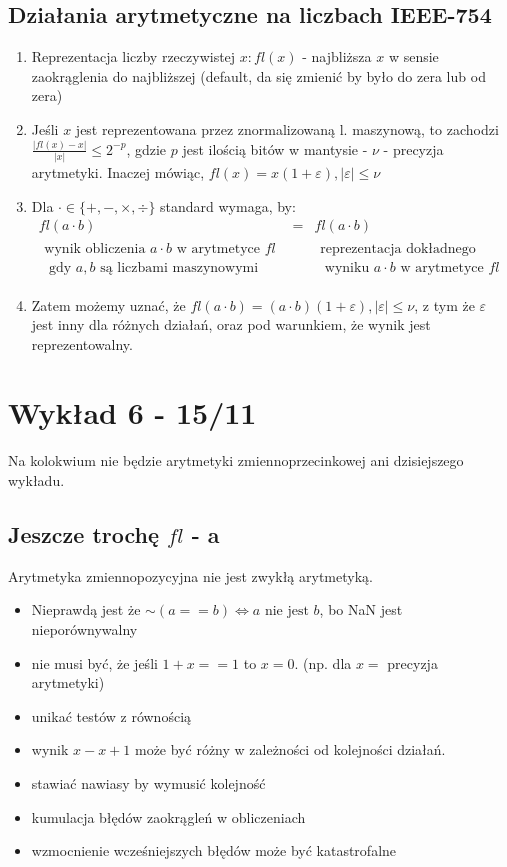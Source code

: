 \documentclass{article}
\begin{document}
\subsection{Działania arytmetyczne na liczbach IEEE-754}
\begin{enumerate}
	\item Reprezentacja liczby rzeczywistej $x: fl(x)$ - najbliższa $ x $ w sensie zaokrąglenia do najbliższej (default, da się zmienić by było do zera lub od zera)
	\item Jeśli $ x $ jest reprezentowana przez znormalizowaną l. maszynową, to zachodzi $ \frac{|fl(x)-x|}{|x|}\le2^{-p} $, gdzie $ p $ jest ilością bitów w mantysie - $ \nu $ - precyzja arytmetyki. Inaczej mówiąc, $ fl(x)=x(1+\varepsilon), |\varepsilon|\le\nu $
	\item Dla $ \cdot\in\{+,-,\times,\div\} $ standard wymaga, by: 
	$$ \begin{matrix}
	fl(a\cdot b) & = & fl(a\cdot b)\\
	\begin{matrix}
	\text{wynik obliczenia }a\cdot b\text{ w arytmetyce }fl\\
	\text{ gdy } a,b \text{ są liczbami maszynowymi} 
	\end{matrix}
	
	& & 
	\begin{matrix}
		\text{reprezentacja dokładnego}\\
		\text{ wyniku } a\cdot b\text{ w arytmetyce }fl
	\end{matrix}
\end{matrix}$$
\item Zatem możemy uznać, że $ fl(a\cdot b) = (a\cdot b)(1+\varepsilon), |\varepsilon|\le \nu$, z tym że $ \varepsilon $ jest inny dla różnych działań, oraz pod warunkiem, że wynik jest reprezentowalny.
\end{enumerate}
\section{Wykład 6 - 15/11}
Na kolokwium nie będzie arytmetyki zmiennoprzecinkowej ani dzisiejszego wykładu.
\subsection{Jeszcze trochę $fl$ - a}
Arytmetyka zmiennopozycyjna nie jest zwykłą arytmetyką.
\begin{itemize}
\item Nieprawdą jest że $ \sim(a==b) \iff a\text{ nie jest } b $, bo NaN jest nieporównywalny
\item nie musi być, że jeśli $ 1 + x == 1 $ to $ x = 0 $. (np. dla $ x= $ precyzja arytmetyki)
\item unikać testów z równością
\item wynik $ x - x + 1 $ może być różny w zależności od kolejności działań.
\item stawiać nawiasy by wymusić kolejność
\item kumulacja błędów zaokrągleń w obliczeniach 
\item wzmocnienie wcześniejszych błędów może być katastrofalne

\end{itemize}
\end{document}
